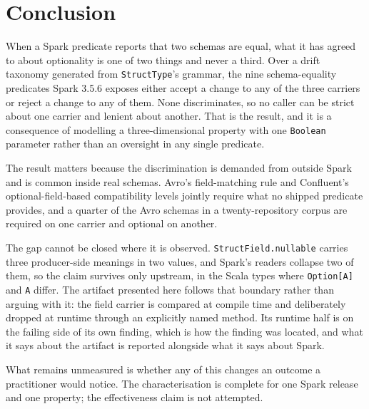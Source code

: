 \section{Conclusion}

When a Spark predicate reports that two schemas are equal, what it has agreed to about optionality is one of two things and never a third. Over a drift taxonomy generated from \texttt{StructType}'s grammar, the nine schema-equality predicates Spark 3.5.6 exposes either accept a change to any of the three carriers or reject a change to any of them. None discriminates, so no caller can be strict about one carrier and lenient about another. That is the result, and it is a consequence of modelling a three-dimensional property with one \texttt{Boolean} parameter rather than an oversight in any single predicate.

The result matters because the discrimination is demanded from outside Spark and is common inside real schemas. Avro's field-matching rule and Confluent's optional-field-based compatibility levels jointly require what no shipped predicate provides, and a quarter of the Avro schemas in a twenty-repository corpus are required on one carrier and optional on another.

The gap cannot be closed where it is observed. \texttt{StructField.nullable} carries three producer-side meanings in two values, and Spark's readers collapse two of them, so the claim survives only upstream, in the Scala types where \texttt{Option[A]} and \texttt{A} differ. The artifact presented here follows that boundary rather than arguing with it: the field carrier is compared at compile time and deliberately dropped at runtime through an explicitly named method. Its runtime half is on the failing side of its own finding, which is how the finding was located, and what it says about the artifact is reported alongside what it says about Spark.

What remains unmeasured is whether any of this changes an outcome a practitioner would notice. The characterisation is complete for one Spark release and one property; the effectiveness claim is not attempted.
